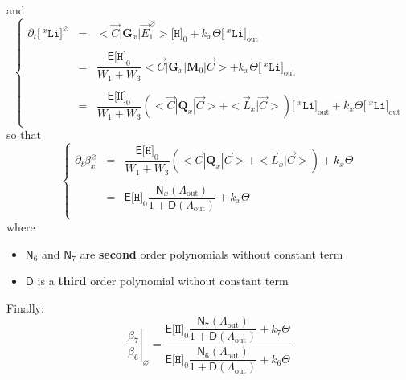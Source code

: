 \documentclass[aps,onecolumn,11pt]{revtex4}
\newcommand{\mychem}[1]{\mathtt{#1}}
\newcommand{\myconc}[1]{\big[#1\big]}
\newcommand{\spLi}[1]{{\!~^{#1}\mychem{Li}}}
\newcommand{\Li}[1]{\myconc{\spLi{#1}}}
\newcommand{\spproton}{\mychem{H}}
\newcommand{\proton}{\myconc{\spproton}}
\newcommand{\myout}[1]{{#1}_{\mathrm{out}}}
\newcommand{\mymat}[1]{{\bm{#1}}}
\newcommand{\LiAll}{\Lambda}
\newcommand{\LiAllOut}{\myout{\LiAll}}
\begin{document}
and
\begin{equation}
\left\lbrace
\begin{array}{rcl}
	\partial_t \Li{x}^\varnothing & = & <\vec{C}|\mymat{G}_x|\vec{E}_1^\varnothing> \proton_0 + k_x \Theta \myout{\Li{x}}\\
	\\
	 & = & \dfrac{\mathsf{E}\proton_0}{W_1+W_3} <\vec{C}|\mymat{G}_x|\mymat{M}_0|\vec{C}> + k_x \Theta \myout{\Li{x}}\\
	 \\
	 & = & \dfrac{\mathsf{E}\proton_0}{W_1+W_3} \left( <\vec{C}|\mymat{Q}_x|\vec{C}> + <\vec{L}_x|\vec{C}>\right)\myout{\Li{x}} + k_x \Theta \myout{\Li{x}}  \\
\end{array}
\right.
\end{equation}
so that
\begin{equation}
\left\lbrace
\begin{array}{rcl}
\partial_t \beta_x^\varnothing & = & \dfrac{\mathsf{E}\proton_0}{W_1+W_3} \left( <\vec{C}|\mymat{Q}_x|\vec{C}> + <\vec{L}_x|\vec{C}>\right) + k_x \Theta \\
\\
& = & \mathsf{E}\proton_0 \dfrac{\mathsf{N}_x(\LiAllOut)}{1+\mathsf{D}(\LiAllOut)} + k_x \Theta \\
\end{array}
\right.
\end{equation}
where 
\begin{itemize}
\item ${\mathsf{N}_6}$ and  ${\mathsf{N}_7}$ are  {\bf second} order polynomials without constant term
\item ${\mathsf{D}}$ is a {\bf third } order polynomial without constant term
\end{itemize}
Finally:
\begin{equation}
\left.\dfrac{\beta_7}{\beta_6}\right\vert_{\varnothing} = 
\dfrac{
\mathsf{E}\proton_0 \dfrac{\mathsf{N}_7(\LiAllOut)}{1+\mathsf{D}(\LiAllOut)} + k_7 \Theta 
}
{
\mathsf{E}\proton_0 \dfrac{\mathsf{N}_6(\LiAllOut)}{1+\mathsf{D}(\LiAllOut)} + k_6 \Theta 
}
\end{equation}
\end{document}
